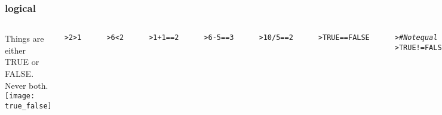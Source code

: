 \documentclass[13pt,aspectratio=169]{beamer}\usepackage[]{graphicx}\usepackage[]{color}
\makeatletter
\newcommand{\hlnum}[1]{\textcolor[rgb]{0.686,0.059,0.569}{#1}}%
\newcommand{\hlcom}[1]{\textcolor[rgb]{0.678,0.584,0.686}{\textit{#1}}}%
\newcommand{\hlopt}[1]{\textcolor[rgb]{0,0,0}{#1}}%
\newcommand{\hlstd}[1]{\textcolor[rgb]{0.345,0.345,0.345}{#1}}%
\newenvironment{kframe}{%
 \def\at@end@of@kframe{}%
 \ifinner\ifhmode%
  \def\at@end@of@kframe{\end{minipage}}%
  \begin{minipage}{\columnwidth}%
 \fi\fi%
 \def\FrameCommand##1{\hskip\@totalleftmargin \hskip-\fboxsep
 \colorbox{shadecolor}{##1}\hskip-\fboxsep
     \hskip-\linewidth \hskip-\@totalleftmargin \hskip\columnwidth}%
 \MakeFramed {\advance\hsize-\width
   \@totalleftmargin\z@ \linewidth\hsize
   \@setminipage}}%
 {\par\unskip\endMakeFramed%
 \at@end@of@kframe}
\newenvironment{knitrout}{}{} %
\renewenvironment{knitrout}{\setlength{\topsep}{0mm}}{}
\makeatother
\begin{document}
\begin{frame}[fragile]
    \frametitle{logical}
    \begin{columns}[t]
	Things are either TRUE or FALSE. Never both.
	\vskip6pt
	\texttt{[image: true\_false]}
\begin{knitrout}\small
{}\color{fgcolor}\begin{kframe}
\begin{alltt}
\hlstd{> }\hlnum{2} \hlopt{>} \hlnum{1}
\end{alltt}
\begin{verbatim}
[1] TRUE
\end{verbatim}
\begin{alltt}
\hlstd{> }\hlnum{6} \hlopt{<} \hlnum{2}
\end{alltt}
\begin{verbatim}
[1] FALSE
\end{verbatim}
\begin{alltt}
\hlstd{> }\hlnum{1} \hlopt{+} \hlnum{1} \hlopt{==} \hlnum{2}
\end{alltt}
\begin{verbatim}
[1] TRUE
\end{verbatim}
\begin{alltt}
\hlstd{> }\hlnum{6} \hlopt{-} \hlnum{5} \hlopt{==} \hlnum{3}
\end{alltt}
\begin{verbatim}
[1] FALSE
\end{verbatim}
\begin{alltt}
\hlstd{> }\hlnum{10} \hlopt{/} \hlnum{5} \hlopt{==} \hlnum{2}
\end{alltt}
\begin{verbatim}
[1] TRUE
\end{verbatim}
\end{kframe}
\end{knitrout}
\begin{knitrout}\small
{}\color{fgcolor}\begin{kframe}
\begin{alltt}
\hlstd{> }\hlnum{TRUE} \hlopt{==} \hlnum{FALSE}
\end{alltt}
\begin{verbatim}
[1] FALSE
\end{verbatim}
\begin{alltt}
\hlstd{> }\hlcom{# Not equal}
\hlstd{> }\hlnum{TRUE} \hlopt{!=} \hlnum{FALSE}

\end{alltt}
\end{kframe}
\end{knitrout}
\end{columns}
\end{frame}
\end{document}
